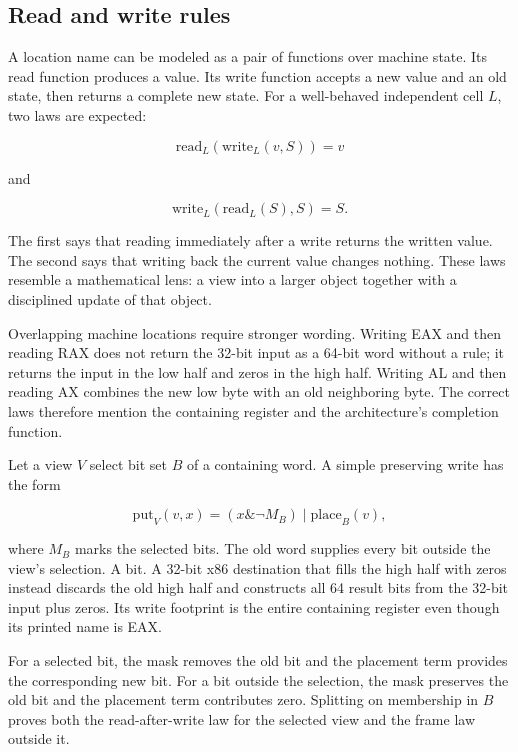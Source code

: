 \subsection{Read and write rules}

A location name can be modeled as a pair of functions over machine state. Its
read function produces a value. Its write function accepts a new value and an
old state, then returns a complete new state. For a well-behaved independent
cell \(L\), two laws are expected:

\[
  \mathrm{read}_L(\mathrm{write}_L(v,S))=v
\]

and

\[
  \mathrm{write}_L(\mathrm{read}_L(S),S)=S.
\]

The first says that reading immediately after a write returns the written
value. The second says that writing back the current value changes nothing.
These laws resemble a mathematical lens: a view into a larger object together
with a disciplined update of that object.

Overlapping machine locations require stronger wording. Writing EAX and then
reading RAX does not return the 32-bit input as a 64-bit word without a rule;
it returns the input in the low half and zeros in the high half. Writing AL
and then reading AX combines the new low byte with an old neighboring byte.
The correct laws therefore mention the containing register and the
architecture's completion function.

Let a view \(V\) select bit set \(B\) of a containing word. A simple preserving
write has the form

\[
  \mathrm{put}_V(v,x)
  = (x\mathbin{\&}\neg M_B)
    \mathbin{|} \mathrm{place}_B(v),
\]

where \(M_B\) marks the selected bits. The old word supplies every bit outside
the view's selection. A
bit. A 32-bit x86 destination that fills the high half with zeros instead discards the old high half and
constructs all 64 result bits from the 32-bit input plus zeros. Its write
footprint is the entire containing register even though its printed name is
EAX.

\begin{proofkit}[title={A preserving view changes only selected bits}]
For a selected bit, the mask removes the old bit and the placement term
provides the corresponding new bit. For a bit outside the selection, the mask preserves
the old bit and the placement term contributes zero. Splitting on membership
in \(B\) proves both the read-after-write law for the selected view and the
frame law outside it.
\end{proofkit}

